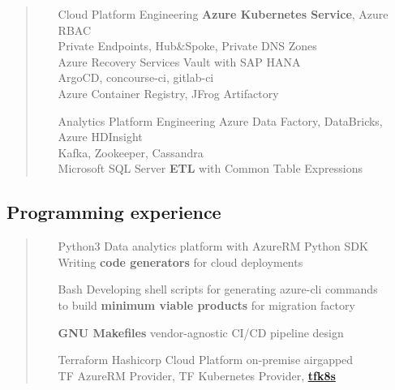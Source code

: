 \documentclass[a4paper]{report}
\begin{document}
\begin{quote}
\begin{enumerate}

\item[Cloud Platform Engineering]
                    \textbf{Azure Kubernetes Service}, Azure RBAC\\
                    Private Endpoints, Hub\&Spoke, Private DNS Zones\\
                    Azure Recovery Services Vault with SAP HANA\\
                    ArgoCD, concourse-ci, gitlab-ci\\
                    Azure Container Registry, JFrog Artifactory

\item[Analytics Platform Engineering]
                    Azure Data Factory, DataBricks, Azure HDInsight\\
                    Kafka, Zookeeper, Cassandra\\
                    Microsoft SQL Server \textbf{ETL} with Common Table Expressions

\end{enumerate}
\end{quote}

\subsection*{Programming experience}

\begin{quote}
\begin{enumerate}

\item[Python3]
                    Data analytics platform with AzureRM Python SDK\\
                    Writing \textbf{code generators} for cloud deployments

\item[Bash]
                    Developing shell scripts for generating azure-cli commands\\
                    to build \textbf{minimum viable products} for migration factory

\item[\textbf{GNU Makefiles}]
                    vendor-agnostic CI/CD pipeline design

\item[Terraform]
                    Hashicorp Cloud Platform on-premise airgapped\\
                    TF AzureRM Provider, TF Kubernetes Provider, \href{https://github.com/jrhouston/tfk8s}{\textbf{tfk8s}}

\end{enumerate}
\end{quote}
\end{document}

